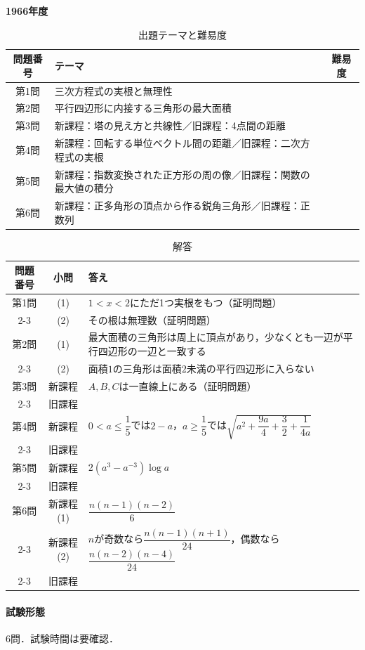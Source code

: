 \documentclass[../../main.tex]{subfiles}
\begin{document}
\begin{center}
  {\fontsize{48pt}{58pt}\selectfont \textbf{1966}\normalsize\textbf{年度}}
\end{center}

\begin{table}[htb]
  \centering
  \caption{出題テーマと難易度}
  \begin{tabular}{|c|p{9cm}|c|}
    \hline
    \textbf{問題番号} & \textbf{テーマ} & \textbf{難易度} \\
    \hline
    第1問 & 三次方程式の実根と無理性 & \\
    \hline
    第2問 & 平行四辺形に内接する三角形の最大面積 & \\
    \hline
    第3問 & 新課程：塔の見え方と共線性／旧課程：4点間の距離 & \\
    \hline
    第4問 & 新課程：回転する単位ベクトル間の距離／旧課程：二次方程式の実根 & \\
    \hline
    第5問 & 新課程：指数変換された正方形の周の像／旧課程：関数の最大値の積分 & \\
    \hline
    第6問 & 新課程：正多角形の頂点から作る鋭角三角形／旧課程：正数列 & \\
    \hline
  \end{tabular}
\end{table}

\begin{table}[htb]
  \centering
  \caption{解答}
  \renewcommand{\arraystretch}{1.4}
  \begin{tabular}{|c|c|p{9cm}|}
    \hline
    \textbf{問題番号} & \textbf{小問} & \textbf{答え} \\
    \hline
    第1問 & (1) & $1<x<2$にただ1つ実根をもつ（証明問題） \\
    \cline{2-3}
    & (2) & その根は無理数（証明問題） \\
    \hline
    第2問 & (1) & 最大面積の三角形は周上に頂点があり，少なくとも一辺が平行四辺形の一辺と一致する \\
    \cline{2-3}
    & (2) & 面積$1$の三角形は面積$2$未満の平行四辺形に入らない \\
    \hline
    第3問 & 新課程 & $A,B,C$は一直線上にある（証明問題） \\
    \cline{2-3}
    & 旧課程 &  \\
    \hline
    第4問 & 新課程 & $0<a\le\dfrac{1}{5}$では$2-a$，$a\ge\dfrac{1}{5}$では$\sqrt{a^2+\dfrac{9a}{4}+\dfrac{3}{2}+\dfrac{1}{4a}}$ \\
    \cline{2-3}
    & 旧課程 &  \\
    \hline
    第5問 & 新課程 & $2(a^3-a^{-3})\log a$ \\
    \cline{2-3}
    & 旧課程 &  \\
    \hline
    第6問 & 新課程(1) & $\dfrac{n(n-1)(n-2)}{6}$ \\
    \cline{2-3}
    & 新課程(2) & $n$が奇数なら$\dfrac{n(n-1)(n+1)}{24}$，偶数なら$\dfrac{n(n-2)(n-4)}{24}$ \\
    \cline{2-3}
    & 旧課程 &  \\
    \hline
  \end{tabular}
\end{table}

\paragraph{試験形態}
6問．試験時間は要確認．
\end{document}
